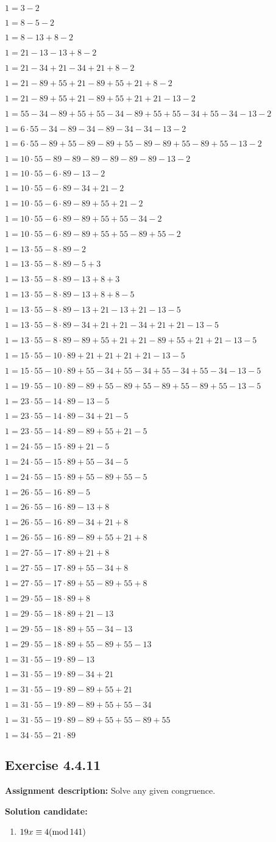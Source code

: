 \documentclass{report}
\newcommand{\cent}[1]{\begin{center}#1\end{center}}
\newcommand{\assignmentDescription}{\textbf{Assignment description: }}
\newcommand{\solution}{\textbf{Solution candidate: }}
\newcommand{\Exercise}[1]{\subsection{Exercise #1}}
\newcommand{\defaultEnumerateLabel}{\textbf{\alph*.}}
\newcommand{\modInline}{\text{mod\,}}
\newcommand{\myItem}[1]{\item #1\\}
\begin{document}
\begin{enumerate}[label=\defaultEnumerateLabel]
\begin{enumerate}[label=\defaultEnumerateLabel]
		\cent{$1 = 3-2$}
		\cent{$1 = 8-5-2 $}
		\cent{$1 = 8-13+8-2 $}
		\cent{$1 = 21 -13-13+8-2 $}
		\cent{$1 = 21 -34+21-34+21+8-2$}
		\cent{$1 = 21 -89+55+21-89+55+21+8-2 $}
		\cent{$1 = 21 -89+55+21-89+55+21+21-13-2 $}
		\cent{$1 = 55-34 -89+55+55-34-89+55+55-34+55-34-13-2 $}
		\cent{$1 = 6 \cdot 55-34 -89-34-89-34-34-13-2 $}
		\cent{$1 = 6 \cdot 55-89+55 -89-89+55-89-89+55-89+55-13-2 $}
		\cent{$1 = 10 \cdot 55-89 -89-89-89-89-89-13-2 $}
		\cent{$1 = 10 \cdot 55-6 \cdot 89-13-2$}
		\cent{$1 = 10 \cdot 55-6 \cdot 89-34+21-2 $}
		\cent{$1 = 10 \cdot 55-6 \cdot 89-89+55+21-2 $}
		\cent{$1 = 10 \cdot 55-6 \cdot 89-89+55+55-34-2$}
		\cent{$1 = 10 \cdot 55-6 \cdot 89-89+55+55-89+55-2 $}
		\cent{$1 = 13 \cdot 55-8 \cdot 89-2$}
		\cent{$1 = 13 \cdot 55-8 \cdot 89-5+3 $}
		\cent{$1 = 13 \cdot 55-8 \cdot 89-13+8+3 $}
		\cent{$1 = 13 \cdot 55-8 \cdot 89-13+8+8-5 $}
		\cent{$1 = 13 \cdot 55-8 \cdot 89-13+21-13+21-13-5 $}
		\cent{$1 = 13 \cdot 55-8 \cdot 89-34+21+21-34+21+21-13-5 $}
		\cent{$1 = 13 \cdot 55-8 \cdot 89-89+55+21+21-89+55+21+21-13-5 $}
		\cent{$1 = 15 \cdot 55-10 \cdot 89+21+21+21+21-13-5 $}
		\cent{$1 = 15 \cdot 55-10 \cdot 89+55-34+55-34+55-34+55-34-13-5 $}
		\cent{$1 = 19 \cdot 55-10 \cdot 89-89+55-89+55-89+55-89+55-13-5 $}
		\cent{$1 = 23 \cdot 55-14 \cdot 89-13-5 $}
		\cent{$1 = 23 \cdot 55-14 \cdot 89-34+21-5 $}
		\cent{$1 = 23 \cdot 55-14 \cdot 89-89+55+21-5 $}
		\cent{$1 = 24 \cdot 55-15 \cdot 89+21-5 $}
		\cent{$1 = 24 \cdot 55-15 \cdot 89+55-34-5 $}
		\cent{$1 = 24 \cdot 55-15 \cdot 89+55-89+55-5 $}
		\cent{$1 = 26 \cdot 55-16 \cdot 89-5 $}
		\cent{$1 = 26 \cdot 55-16 \cdot 89-13+8 $}
		\cent{$1 = 26 \cdot 55-16 \cdot 89-34+21+8 $}
		\cent{$1 = 26 \cdot 55-16 \cdot 89-89+55+21+8 $}
		\cent{$1 = 27 \cdot 55-17 \cdot 89+21+8 $}
		\cent{$1 = 27 \cdot 55-17 \cdot 89+55-34+8 $}
		\cent{$1 = 27 \cdot 55-17 \cdot 89+55-89+55+8 $}
		\cent{$1 = 29 \cdot 55-18 \cdot 89+8 $}
		\cent{$1 = 29 \cdot 55-18 \cdot 89+21-13 $}
		\cent{$1 = 29 \cdot 55-18 \cdot 89+55-34-13 $}
		\cent{$1 = 29 \cdot 55-18 \cdot 89+55-89+55-13 $}
		\cent{$1 = 31 \cdot 55-19 \cdot 89-13 $}
		\cent{$1 = 31 \cdot 55-19 \cdot 89-34+21 $}
		\cent{$1 = 31 \cdot 55-19 \cdot 89-89+55+21 $}
		\cent{$1 = 31 \cdot 55-19 \cdot 89-89+55+55-34 $}
		\cent{$1 = 31 \cdot 55-19 \cdot 89-89+55+55-89+55 $}
		\cent{$1 = 34 \cdot 55-21 \cdot 89 $}
	\end{enumerate}

	\Exercise{4.4.11}
	
	\assignmentDescription
	Solve any given congruence.
	
	\solution
	\begin{enumerate}[label=\defaultEnumerateLabel]
		\myItem{$19x \equiv 4 (\modInline 141)$}
		

\end{enumerate}
\end{enumerate}
\end{document}
